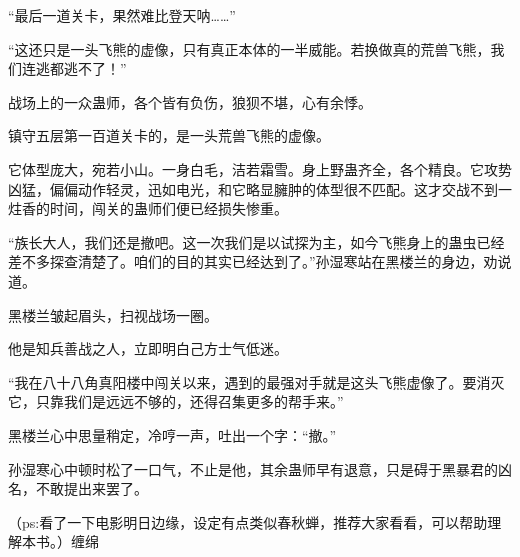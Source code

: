 \begin{this_body}
“最后一道关卡，果然难比登天呐……”

“这还只是一头飞熊的虚像，只有真正本体的一半威能。若换做真的荒兽飞熊，我们连逃都逃不了！”

战场上的一众蛊师，各个皆有负伤，狼狈不堪，心有余悸。

镇守五层第一百道关卡的，是一头荒兽飞熊的虚像。

它体型庞大，宛若小山。一身白毛，洁若霜雪。身上野蛊齐全，各个精良。它攻势凶猛，偏偏动作轻灵，迅如电光，和它略显臃肿的体型很不匹配。这才交战不到一炷香的时间，闯关的蛊师们便已经损失惨重。

“族长大人，我们还是撤吧。这一次我们是以试探为主，如今飞熊身上的蛊虫已经差不多探查清楚了。咱们的目的其实已经达到了。”孙湿寒站在黑楼兰的身边，劝说道。

黑楼兰皱起眉头，扫视战场一圈。

他是知兵善战之人，立即明白己方士气低迷。

“我在八十八角真阳楼中闯关以来，遇到的最强对手就是这头飞熊虚像了。要消灭它，只靠我们是远远不够的，还得召集更多的帮手来。”

黑楼兰心中思量稍定，冷哼一声，吐出一个字：“撤。”

孙湿寒心中顿时松了一口气，不止是他，其余蛊师早有退意，只是碍于黑暴君的凶名，不敢提出来罢了。

（ps:看了一下电影明日边缘，设定有点类似春秋蝉，推荐大家看看，可以帮助理解本书。）缠绵

\end{this_body}

